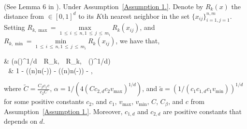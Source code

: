 \documentclass[twoside,11pt]{article}
\begin{document}
\begin{lemma}
\label{Lemma_13} (See Lemma 6 in \cite{madrid2020adaptive}). Under Assumption~\ref{Assumption 1.}. Denote by $R_k(x)$ the distance from $\in [0,1]^d$ to its $K$th nearest neighbor in the set $\{x_{ij}\}_{i=1,j=1}^{n,m}$. Setting $R_{k,\max} = \max\limits_{1 \,\leq\, i \,\leq\, n,1 \,\leq\, j \,\leq\, m_i} R_k(x_{ij})$,
and $R_{k,\min} = \min\limits_{1 \,\leq\, i \,\leq\, n,1 \,\leq\, j \,\leq\, m_i} R_k(x_{ij})$, we have that,
\end{lemma}
\bea 
& \left(a\left(\right)^{1/d} \,\leq\, R_{k,\min} \,\leq\, R_{k,\max} \,\leq\, \left(\right)^{1/d}\right) \\
\,\geq\, & 1 -  \left(\log(n)n\exp\left(-\right)\right) - \left(\log(n)n\exp\left(-\right)\right) - ,
\bea  

where $\tilde{C} = \frac{C_{\beta}c_1 c}{c_2C}$, $\alpha = 1/(4(Cc_{2,d}c_2v_{\max})^{1/d})$, and $\tilde{a} = (1/(c_1c_{1,d}c_1 v_{\min}))^{1/d}$ for some positive constants $c_2$, and $c_1$, $v_{\max}$, $v_{\min}$, $C$, $C_{\beta}$, and $c$ from Assumption~\ref{Assumption 1.}. Moreover, $c_{1,d}$ and $c_{2,d}$ are positive constants that depends on $d$.
\end{document}
